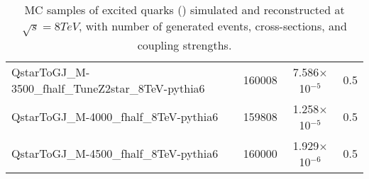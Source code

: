 \begin{table}[h!]
\begin{center}
{\begin{tabular}{lccc}
QstarToGJ\_M-3500\_fhalf\_TuneZ2star\_8TeV-pythia6 & 160008 & 7.586$\times$10$^{-5}$& 0.5 \\
QstarToGJ\_M-4000\_fhalf\_8TeV-pythia6 & 159808 & 1.258$\times$10$^{-5}$& 0.5 \\
QstarToGJ\_M-4500\_fhalf\_8TeV-pythia6 & 160000 & 1.929$\times$10$^{-6}$& 0.5 \\
\hline
\end{tabular}
}
\caption{MC samples of excited quarks (\qstar) simulated and reconstructed at $\sqrt{s}=8\unit{TeV}$, with number of generated events, cross-sections, and coupling strengths. 
}
   \label{Table:SigSamples}
\end{center}
\end{table}
